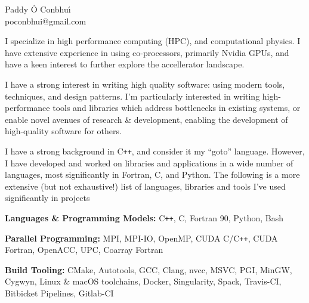 \documentclass[11pt]{article}
\newcommand{\resumeSection}[1]{
    \par
    \large {\sc {#1}}
    \par
    \vspace{-0.9\baselineskip}
    \hrulefill
    \vspace{0.25\baselineskip}
    \par
}
\newenvironment{resumeSubSectionBody}{
    \par
    \vspace{-0.4\parskip}
    \begin{small}
    \par
} {
    \par
    \end{small}
    \par
}
\newenvironment{resumeDescription}{
    \vspace{-0.5\baselineskip}
    \begin{description}
} {
    \end{description}
}
\begin{document}


%
%
\begin{center}
    { \huge \textbf \sc Paddy \'O Conbhu\'\i } \\
    poconbhui@gmail.com
\end{center}




\resumeSection{Software Development}


%
%
\begin{resumeSubSectionBody}

    I specialize in high performance computing (HPC), and computational physics.
    I have extensive experience in using co-processors, primarily Nvidia GPUs,
    and have a keen interest to further explore the accellerator landscape.

    I have a strong interest in writing high quality software: using modern
    tools, techniques, and design patterns.
    I'm particularly interested in writing high-performance tools and libraries
    which address bottlenecks in existing systems, or enable novel avenues of
    research \& development, enabling the development of high-quality software
    for others.

    I have a strong background in C\verb!++!, and consider it my ``goto''
    language.
    However, I have developed and worked on libraries and applications in a wide
    number of languages, most significantly in Fortran, C, and Python.
    The following is a more extensive (but not exhaustive!) list of languages,
    libraries and tools I've used significantly in projects

    \begin{resumeDescription}
        \item{\bf Languages \& Programming Models:}
            C\verb!++!, C, Fortran 90, Python, Bash

        \item{\bf Parallel Programming:}
            MPI, MPI-IO, OpenMP, CUDA C/C\verb!++!, CUDA Fortran,
            OpenACC, UPC, Coarray Fortran

        \item{\bf Build Tooling:}
            CMake, Autotools, GCC, Clang, nvcc, MSVC, PGI, MinGW, Cygwyn,
            Linux \& macOS toolchains,
            Docker, Singularity, Spack,
            Travis-CI, Bitbicket Pipelines, Gitlab-CI


\end{resumeDescription}
\end{resumeSubSectionBody}
\end{document}
